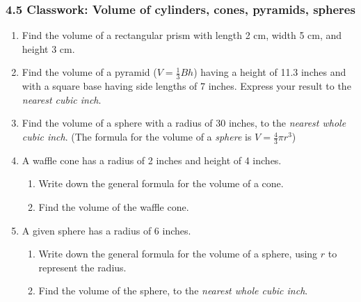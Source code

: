 

\fancyhead[LE]{\thepage}



\subsubsection*{4.5 Classwork: Volume of cylinders, cones, pyramids, spheres}
\begin{enumerate}
\item Find the volume of a rectangular prism with length 2 cm, width 5 cm, and height 3 cm. \vspace{1cm}

\item Find the volume of a pyramid ($V=\frac{1}{3}Bh$) having a height of 11.3 inches and with a square base having side lengths of 7 inches. Express your result to the \emph{nearest cubic inch}. \vspace{3cm}


\item Find the volume of a sphere with a radius of 30 inches, to the \emph{nearest whole cubic inch}. (The formula for the volume of a \emph{sphere} is $V=\frac{4}{3}\pi r^3$) \vspace{3cm}

\item A waffle cone has a radius of 2 inches and height of 4 inches. 
\begin{enumerate}
  \item Write down the general formula for the volume of a cone. \vspace{1cm}
  \item Find the volume of the waffle cone.
\end{enumerate}  \vspace{3cm}

\item A given sphere has a radius of 6 inches.
\begin{enumerate}
  \item Write down the general formula for the volume of a sphere, using $r$ to represent the radius. \vspace{1cm}
  \item Find the volume of the sphere, to the \emph{nearest whole cubic inch}.
\end{enumerate}  \vspace{3cm}


\end{enumerate}
